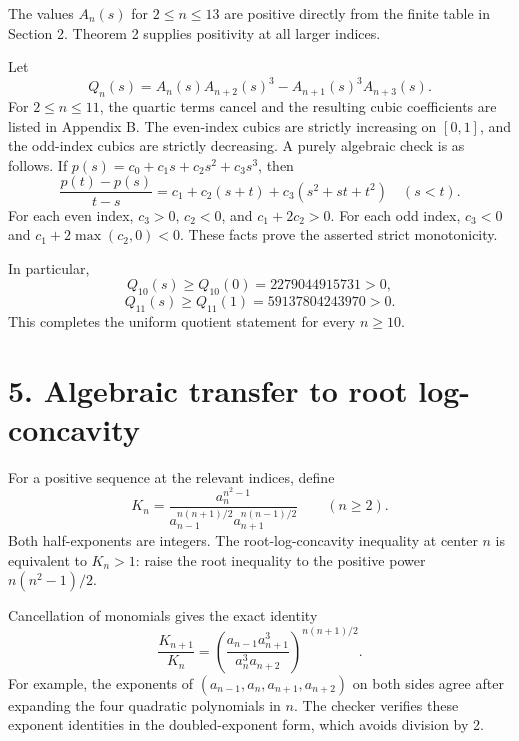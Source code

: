 \documentclass[
  11pt,
  a4paper,
]{article}
\begin{document}
The values \(A_n(s)\) for \(2\le n\le13\) are positive directly from the
finite table in Section 2. Theorem 2 supplies positivity at all larger
indices.

Let \[
Q_n(s)=A_n(s)A_{n+2}(s)^3-A_{n+1}(s)^3A_{n+3}(s).
\tag{26}
\] For \(2\le n\le11\), the quartic terms cancel and the resulting cubic
coefficients are listed in Appendix B. The even-index cubics are
strictly increasing on \([0,1]\), and the odd-index cubics are strictly
decreasing. A purely algebraic check is as follows. If
\(p(s)=c_0+c_1s+c_2s^2+c_3s^3\), then \[
\frac{p(t)-p(s)}{t-s}=c_1+c_2(s+t)+c_3(s^2+st+t^2)
\quad(s<t).
\] For each even index, \(c_3>0\), \(c_2<0\), and \(c_1+2c_2>0\). For
each odd index, \(c_3<0\) and \(c_1+2\max(c_2,0)<0\). These facts prove
the asserted strict monotonicity.

In particular, \[
Q_{10}(s)\ge Q_{10}(0)=2279044915731>0,
\] \[
Q_{11}(s)\ge Q_{11}(1)=59137804243970>0.
\] This completes the uniform quotient statement for every \(n\ge10\).

\section{5. Algebraic transfer to root
log-concavity}\label{algebraic-transfer-to-root-log-concavity}

For a positive sequence at the relevant indices, define \[
K_n=\frac{a_n^{n^2-1}}
{a_{n-1}^{n(n+1)/2}a_{n+1}^{n(n-1)/2}}
\qquad(n\ge2).
\] Both half-exponents are integers. The root-log-concavity inequality
at center \(n\) is equivalent to \(K_n>1\): raise the root inequality to
the positive power \(n(n^2-1)/2\).

Cancellation of monomials gives the exact identity \[
\frac{K_{n+1}}{K_n}
=\left(\frac{a_{n-1}a_{n+1}^3}{a_n^3a_{n+2}}\right)^{n(n+1)/2}.
\tag{27}
\] For example, the exponents of \((a_{n-1},a_n,a_{n+1},a_{n+2})\) on
both sides agree after expanding the four quadratic polynomials in
\(n\). The checker verifies these exponent identities in the
doubled-exponent form, which avoids division by 2.
\end{document}
